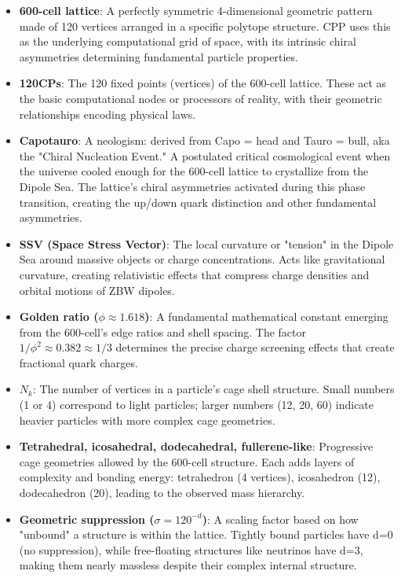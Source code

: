 \documentclass{article}
\begin{document}
\begin{itemize}
\item \textbf{600-cell lattice}: A perfectly symmetric 4-dimensional geometric pattern made of 120 vertices arranged in a specific polytope structure. CPP uses this as the underlying computational grid of space, with its intrinsic chiral asymmetries determining fundamental particle properties.

\item \textbf{120CPs}: The 120 fixed points (vertices) of the 600-cell lattice. These act as the basic computational nodes or processors of reality, with their geometric relationships encoding physical laws.

\item \textbf{Capotauro}: A neologism: derived from Capo = head and Tauro = bull, aka the "Chiral Nucleation Event." A postulated critical cosmological event when the universe cooled enough for the 600-cell lattice to crystallize from the Dipole Sea. The lattice's chiral asymmetries activated during this phase transition, creating the up/down quark distinction and other fundamental asymmetries.

\item \textbf{SSV (Space Stress Vector)}: The local curvature or "tension" in the Dipole Sea around massive objects or charge concentrations. Acts like gravitational curvature, creating relativistic effects that compress charge densities and orbital motions of ZBW dipoles.

\item \textbf{Golden ratio ($\phi \approx 1.618$)}: A fundamental mathematical constant emerging from the 600-cell's edge ratios and shell spacing. The factor $1/\phi^2 \approx 0.382 \approx 1/3$ determines the precise charge screening effects that create fractional quark charges.

\item \textbf{$N_k$}: The number of vertices in a particle's cage shell structure. Small numbers (1 or 4) correspond to light particles; larger numbers (12, 20, 60) indicate heavier particles with more complex cage geometries.

\item \textbf{Tetrahedral, icosahedral, dodecahedral, fullerene-like}: Progressive cage geometries allowed by the 600-cell structure. Each adds layers of complexity and bonding energy: tetrahedron (4 vertices), icosahedron (12), dodecahedron (20), leading to the observed mass hierarchy.

\item \textbf{Geometric suppression ($\sigma = 120^{-d}$)}: A scaling factor based on how "unbound" a structure is within the lattice. Tightly bound particles have d=0 (no suppression), while free-floating structures like neutrinos have d=3, making them nearly massless despite their complex internal structure.
\end{itemize}
\end{document}
